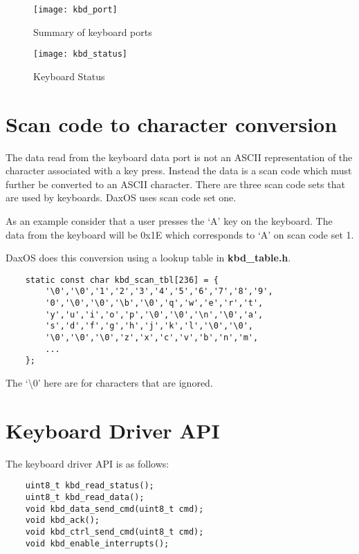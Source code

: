 \begin{figure}[h!]
    \begin{center}
        \texttt{[image: kbd\_port]}
        \caption{Summary of keyboard ports}
    \end{center}
\end{figure}

\begin{figure}[h!]
    \begin{center}
        \texttt{[image: kbd\_status]}
        \caption{Keyboard Status}
    \end{center}
\end{figure}

\pagebreak
\section{Scan code to character conversion}\label{section:Scan code to character conversion}
The data read from the keyboard data port is not an ASCII representation of the character associated with a key press.
Instead the data is a scan code which must further be converted to an ASCII character.
There are three scan code sets that are used by keyboards. 
DaxOS uses scan code set one. 

\vspace{0.5cm}
As an example consider that a user presses the `A' key on the keyboard. The data from the keyboard will be 0x1E which corresponds to
`A' on scan code set 1.

\vspace{0.5cm}
DaxOS does this conversion using a lookup table in \textbf{kbd\_table.h}.

\begin{lstlisting}
    static const char kbd_scan_tbl[236] = {
        '\0','\0','1','2','3','4','5','6','7','8','9',
        '0','\0','\0','\b','\0','q','w','e','r','t',
        'y','u','i','o','p','\0','\0','\n','\0','a',
        's','d','f','g','h','j','k','l','\0','\0',
        '\0','\0','\0','z','x','c','v','b','n','m',
        ...
    };
\end{lstlisting}

The `\textbackslash0' here are for characters that are ignored.

\section{Keyboard Driver API}\label{section:Keyboard Driver API}

The keyboard driver API is as follows:
\begin{lstlisting}
    uint8_t kbd_read_status();
    uint8_t kbd_read_data();
    void kbd_data_send_cmd(uint8_t cmd);
    void kbd_ack();
    void kbd_ctrl_send_cmd(uint8_t cmd);
    void kbd_enable_interrupts();
\end{lstlisting}